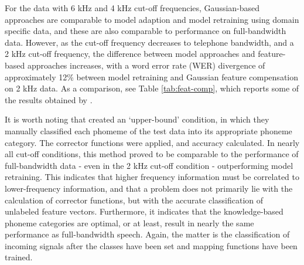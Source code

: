 For the data with 6 kHz and 4 kHz cut-off frequencies, Gaussian-based approaches are comparable to model adaption and model retraining using domain specific data, and these are also comparable to performance on full-bandwidth data.  However, as the cut-off frequency decreases to telephone bandwidth, and a 2 kHz cut-off frequency, the difference between model approaches and feature-based approaches increases, with a word error rate (WER) divergence of approximately 12\% between model retraining and Gaussian feature compensation on 2 kHz data. As a comparison, see Table \ref{tab:feat-comp}, which reports some of the results obtained by \cite{morales:09}.

It is worth noting that \cite{morales:09} created an `upper-bound' condition, in which they manually classified each phomeme of the test data into its appropriate phoneme category.  The corrector functions were applied, and accuracy calculated.  In nearly all cut-off conditions, this method proved to be comparable to the performance of full-bandwidth data - even in the 2 kHz cut-off condition - outperforming model retraining.  This indicates that higher frequency information must be correlated to lower-frequency information, and that a problem does not primarily lie with the calculation of corrector functions, but with the accurate classification of unlabeled feature vectors.  Furthermore, it indicates that the knowledge-based phoneme categories are optimal, or at least, result in nearly the same performance as full-bandwidth speech.  Again, the matter is the classification of incoming signals after the classes have been set and mapping functions have been trained.

